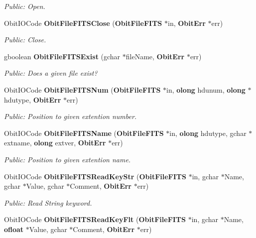 \begin{CompactItemize}
\begin{CompactList}\small\item\em Public: Open. \item\end{CompactList}\item 
Obit\-IOCode {\bf Obit\-File\-FITSClose} ({\bf Obit\-File\-FITS} $\ast$in, {\bf Obit\-Err} $\ast$err)
\begin{CompactList}\small\item\em Public: Close. \item\end{CompactList}\item 
gboolean {\bf Obit\-File\-FITSExist} (gchar $\ast$file\-Name, {\bf Obit\-Err} $\ast$err)
\begin{CompactList}\small\item\em Public: Does a given file exist? \item\end{CompactList}\item 
Obit\-IOCode {\bf Obit\-File\-FITSNum} ({\bf Obit\-File\-FITS} $\ast$in, {\bf olong} hdunum, {\bf olong} $\ast$hdutype, {\bf Obit\-Err} $\ast$err)
\begin{CompactList}\small\item\em Public: Position to given extention number. \item\end{CompactList}\item 
Obit\-IOCode {\bf Obit\-File\-FITSName} ({\bf Obit\-File\-FITS} $\ast$in, {\bf olong} hdutype, gchar $\ast$extname, {\bf olong} extver, {\bf Obit\-Err} $\ast$err)
\begin{CompactList}\small\item\em Public: Position to given extention name. \item\end{CompactList}\item 
Obit\-IOCode {\bf Obit\-File\-FITSRead\-Key\-Str} ({\bf Obit\-File\-FITS} $\ast$in, gchar $\ast$Name, gchar $\ast$Value, gchar $\ast$Comment, {\bf Obit\-Err} $\ast$err)
\begin{CompactList}\small\item\em Public: Read String keyword. \item\end{CompactList}\item 
Obit\-IOCode {\bf Obit\-File\-FITSRead\-Key\-Flt} ({\bf Obit\-File\-FITS} $\ast$in, gchar $\ast$Name, {\bf ofloat} $\ast$Value, gchar $\ast$Comment, {\bf Obit\-Err} $\ast$err)

\end{CompactItemize}
